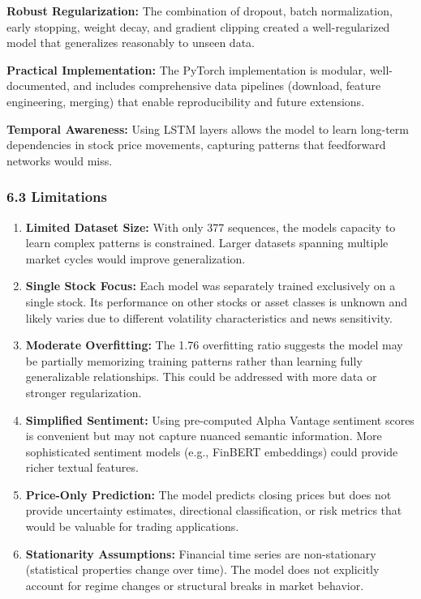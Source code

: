 \documentclass[
]{article}
\begin{document}
\textbf{Robust Regularization:} The combination of dropout, batch
normalization, early stopping, weight decay, and gradient clipping
created a well-regularized model that generalizes reasonably to unseen
data.

\textbf{Practical Implementation:} The PyTorch implementation is
modular, well-documented, and includes comprehensive data pipelines
(download, feature engineering, merging) that enable reproducibility and
future extensions.

\textbf{Temporal Awareness:} Using LSTM layers allows the model to learn
long-term dependencies in stock price movements, capturing patterns that
feedforward networks would miss.

\subsubsection{6.3 Limitations}\label{63-limitations}

\begin{enumerate}
\def\labelenumi{\arabic{enumi}.}
\item
  \textbf{Limited Dataset Size:} With only 377 sequences, the
  model\textquotesingle s capacity to learn complex patterns is
  constrained. Larger datasets spanning multiple market cycles would
  improve generalization.
\item
  \textbf{Single Stock Focus:} Each model was separately trained
  exclusively on a single stock. Its performance on other stocks or
  asset classes is unknown and likely varies due to different volatility
  characteristics and news sensitivity.
\item
  \textbf{Moderate Overfitting:} The 1.76 overfitting ratio suggests the
  model may be partially memorizing training patterns rather than
  learning fully generalizable relationships. This could be addressed
  with more data or stronger regularization.
\item
  \textbf{Simplified Sentiment:} Using pre-computed Alpha Vantage
  sentiment scores is convenient but may not capture nuanced semantic
  information. More sophisticated sentiment models (e.g., FinBERT
  embeddings) could provide richer textual features.
\item
  \textbf{Price-Only Prediction:} The model predicts closing prices but
  does not provide uncertainty estimates, directional classification, or
  risk metrics that would be valuable for trading applications.
\item
  \textbf{Stationarity Assumptions:} Financial time series are
  non-stationary (statistical properties change over time). The model
  does not explicitly account for regime changes or structural breaks in
  market behavior.
\end{enumerate}
\end{document}
